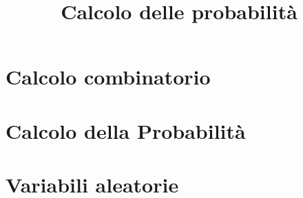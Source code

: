 



\title{Calcolo delle probabilit\`a}

\maketitle

\newpage

\tableofcontents
\newpage

\chapter{Calcolo combinatorio}



\newpage

\chapter{Calcolo della Probabilit\`a}



\newpage

\chapter{Variabili aleatorie}



\newpage


%


